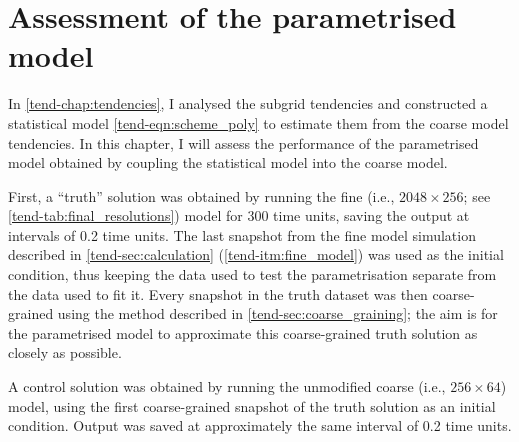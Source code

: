 \documentclass[../main.tex]{subfiles}
\begin{document}
\ifSubfilesClassLoaded{
    \frontmatter
    \tableofcontents
    \mainmatter
}{}

\dropchapter{0.5cm}
\chapter{Assessment of the parametrised model} \label{chap:evaluation}

In \cref{tend-chap:tendencies}, I analysed the subgrid tendencies and
constructed a statistical model \cref{tend-eqn:scheme_poly} to estimate
them from the coarse model tendencies. In this chapter, I will assess
the performance of the parametrised model obtained by coupling the
statistical model into the coarse \rb{} model.

First, a ``truth'' solution was obtained by running the fine (i.e., $2048
\times 256$; see \cref{tend-tab:final_resolutions}) model for 300 time units,
saving the output at intervals of 0.2 time units. The last snapshot from the
fine model simulation described in \cref{tend-sec:calculation}
(\cref{tend-itm:fine_model}) was used as the initial condition, thus keeping
the data used to test the parametrisation separate from the data used to fit
it. Every snapshot in the truth dataset was then coarse-grained using the
method described in \cref{tend-sec:coarse_graining}; the aim is for the
parametrised model to approximate this coarse-grained truth solution as closely
as possible.

A control solution was obtained by running the unmodified coarse (i.e., $256
\times 64$) model, using the first coarse-grained snapshot of the truth
solution as an initial condition. Output was saved at approximately the
same interval of 0.2 time units.
\end{document}
